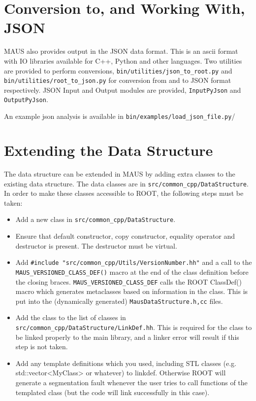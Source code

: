 \section{Conversion to, and Working With, JSON}
MAUS also provides output in the JSON data format. This is an ascii format with IO libraries available for C++, Python and other languages. Two utilities are provided to perform conversions, \verb|bin/utilities/json_to_root.py| and \verb|bin/utilities/root_to_json.py| for conversion from and to JSON format respectively. JSON Input and Output modules are provided, \verb|InputPyJson| and \verb|OutputPyJson|.

An example json analysis is available in \verb|bin/examples/load_json_file.py|/

\section{Extending the Data Structure}
The data structure can be extended in MAUS by adding extra classes to the existing data structure. The data classes are in \verb|src/common_cpp/DataStructure|. In order to make these classes accessible to ROOT, the following steps must be taken:
\begin{itemize}
\item Add a new class in \verb|src/common_cpp/DataStructure|.
\item Ensure that default constructor, copy constructor, equality operator and destructor is present. The destructor must be virtual.
\item Add \verb|#include "src/common_cpp/Utils/VersionNumber.hh"| and a call to the \verb|MAUS_VERSIONED_CLASS_DEF()| macro at the end of the class definition before the closing braces. \verb|MAUS_VERSIONED_CLASS_DEF| calls the ROOT ClassDef() macro which generates metaclasses based on information in the class. This is put into the (dynamically generated) \verb|MausDataStructure.h,cc| files.
\item Add the class to the list of classes in \verb|src/common_cpp/DataStructure/LinkDef.hh|. This is required for the class to be linked properly to the main library, and a linker error will result if this step is not taken.
\item Add any template definitions which you used, including STL classes (e.g. std::vector<MyClass> or whatever) to linkdef. Otherwise ROOT will generate a segmentation fault whenever the user tries to call functions of the templated class (but the code will link successfully in this case).
\end{itemize}
